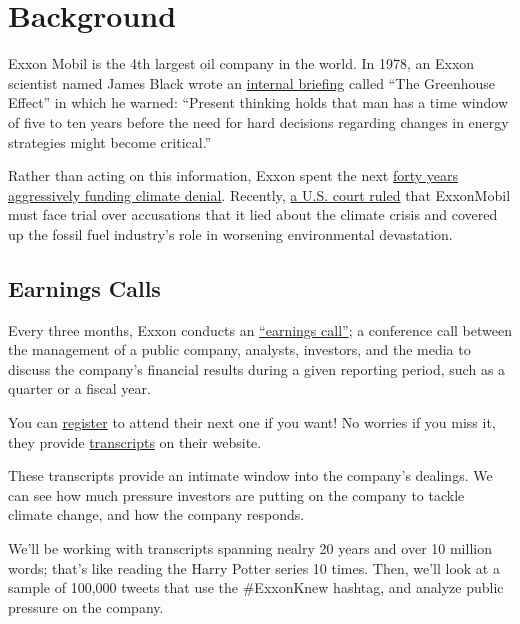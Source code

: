 \documentclass[
  letterpaper,
  DIV=11,
  numbers=noendperiod]{scrreprt}
\begin{document}
\hypertarget{background-1}{%
\section{Background}\label{background-1}}

Exxon Mobil is the 4th largest oil company in the world. In 1978, an
Exxon scientist named James Black wrote an
\href{https://insideclimatenews.org/documents/james-black-1977-presentation/}{internal
briefing} called ``The Greenhouse Effect'' in which he warned: ``Present
thinking holds that man has a time window of five to ten years before
the need for hard decisions regarding changes in energy strategies might
become critical.''

Rather than acting on this information, Exxon spent the next
\href{https://news.harvard.edu/gazette/story/2021/09/oil-companies-discourage-climate-action-study-says/}{forty
years aggressively funding climate denial}. Recently,
\href{https://www.theguardian.com/environment/2022/may/24/exxon-trial-climate-crimes-fossil-fuels-global-heating}{a
U.S. court ruled} that ExxonMobil must face trial over accusations that
it lied about the climate crisis and covered up the fossil fuel
industry's role in worsening environmental devastation.

\hypertarget{earnings-calls}{%
\subsection{Earnings Calls}\label{earnings-calls}}

Every three months, Exxon conducts an
\href{https://www.investopedia.com/terms/e/earnings-call.asp}{``earnings
call''}; a conference call between the management of a public company,
analysts, investors, and the media to discuss the company's financial
results during a given reporting period, such as a quarter or a fiscal
year.

You can
\href{https://globalmeet.webcasts.com/starthere.jsp?ei=1488251\&tp_key=440e363aaf}{register}
to attend their next one if you want! No worries if you miss it, they
provide
\href{https://corporate.exxonmobil.com/Investors/Investor-relations/Investor-materials-archive\#Quarterlyearningsmaterials}{transcripts}
on their website.

These transcripts provide an intimate window into the company's
dealings. We can see how much pressure investors are putting on the
company to tackle climate change, and how the company responds.

We'll be working with transcripts spanning nealry 20 years and over 10
million words; that's like reading the Harry Potter series 10 times.
Then, we'll look at a sample of 100,000 tweets that use the \#ExxonKnew
hashtag, and analyze public pressure on the company.
\end{document}
